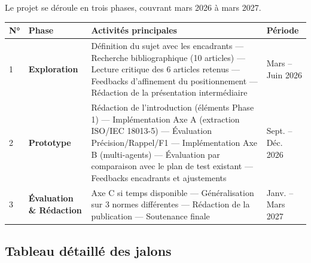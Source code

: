 \documentclass[12pt, a4paper]{article}
\begin{document}
Le projet se déroule en trois phases, couvrant mars 2026 à mars 2027.

\vspace{0.5em}
\begin{center}
\begin{tabularx}{\linewidth}{|C{0.8cm}|L{3.2cm}|>{\raggedright\arraybackslash}X|L{2.5cm}|}
  \hline
  \textbf{N°} & \textbf{Phase} & \textbf{Activités principales} & \textbf{Période} \\
  \hline
  1 & \textbf{Exploration}
    & Définition du sujet avec les encadrants — Recherche bibliographique
      (10 articles) — Lecture critique des 6 articles retenus — Feedbacks
      d'affinement du positionnement — Rédaction de la présentation intermédiaire
    & Mars – Juin 2026 \\
  \hline
  2 & \textbf{Prototype}
    & Rédaction de l'introduction (éléments Phase 1) — Implémentation Axe A
      (extraction ISO/IEC 18013-5) — Évaluation Précision/Rappel/F1 —
      Implémentation Axe B (multi-agents) — Évaluation par comparaison avec
      le plan de test existant — Feedbacks encadrants et ajustements
    & Sept. – Déc. 2026 \\
  \hline
  3 & \textbf{Évaluation \& Rédaction}
    & Axe C si temps disponible — Généralisation sur 3 normes différentes —
      Rédaction de la publication — Soutenance finale
    & Janv. – Mars 2027 \\
  \hline
\end{tabularx}
\end{center}

\subsection{Tableau détaillé des jalons}
\end{document}

